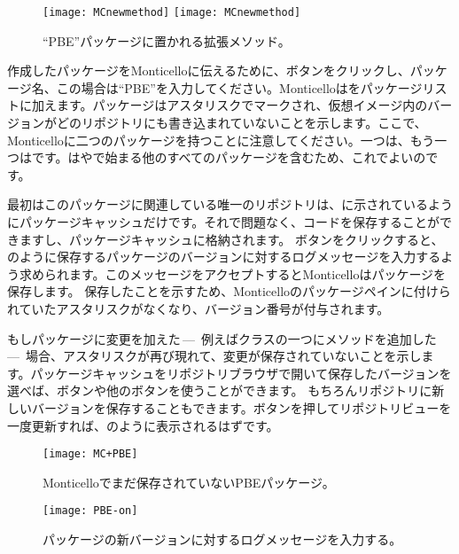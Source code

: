 \documentclass[a4paper,10pt,twoside]{book}
\begin{document}
\begin{figure}[btp]
\begin{center}
\ifluluelse
{\texttt{[image: MCnewmethod]}}
{\texttt{[image: MCnewmethod]}}
\end{center}
\caption{``PBE''パッケージに置かれる拡張メソッド。}
\end{figure}

作成したパッケージをMonticelloに伝えるために、ボタンをクリックし、パッケージ名、この場合は``PBE''を入力してください。Monticelloはをパッケージリストに加えます。パッケージはアスタリスクでマークされ、仮想イメージ内のバージョンがどのリポジトリにも書き込まれていないことを示します。ここで、Monticelloに二つのパッケージを持つことに注意してください。一つは、もう一つはです。はやで始まる他のすべてのパッケージを含むため、これでよいのです。

最初はこのパッケージに関連している唯一のリポジトリは、に示されているようにパッケージキャッシュだけです。それで問題なく、コードを保存することができますし、パッケージキャッシュに格納されます。
ボタンをクリックすると、のように保存するパッケージのバージョンに対するログメッセージを入力するよう求められます。このメッセージをアクセプトするとMonticelloはパッケージを保存します。
保存したことを示すため、Monticelloのパッケージペインに付けられていたアスタリスクがなくなり、バージョン番号が付与されます。

もしパッケージに変更を加えた\,---\, 例えばクラスの一つにメソッドを追加した \,---\, 場合、アスタリスクが再び現れて、変更が保存されていないことを示します。パッケージキャッシュをリポジトリブラウザで開いて保存したバージョンを選べば、ボタンや他のボタンを使うことができます。
もちろんリポジトリに新しいバージョンを保存することもできます。ボタンを押してリポジトリビューを一度更新すれば、のように表示されるはずです。

\begin{figure}[tbp]
\begin{center}
\texttt{[image: MC+PBE]}
\end{center}
\caption{Monticelloでまだ保存されていないPBEパッケージ。}
\end{figure}

\begin{figure}[tbp]
\begin{center}
\texttt{[image: PBE-on]}
\end{center}
\caption{パッケージの新バージョンに対するログメッセージを入力する。}
\end{figure}
\end{document}
